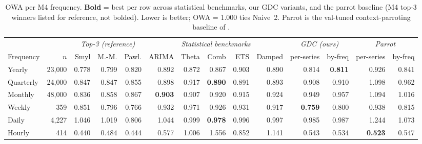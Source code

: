 \begin{table}[t]
\centering
\caption{OWA per M4 frequency. \textbf{Bold} = best per row across statistical benchmarks, our GDC variants, and the parrot baseline (M4 top-3 winners listed for reference, not bolded). Lower is better; OWA = 1.000 ties Naive~2. Parrot is the val-tuned context-parroting baseline of \citet{zhang2025parrot}.}
\label{tab:m4_per_frequency}
\small
\begin{tabular}{l r | r r r | r r r r r | r r | r r}
\toprule
& & \multicolumn{3}{c|}{\emph{Top-3 (reference)}}
& \multicolumn{5}{c|}{\emph{Statistical benchmarks}}
& \multicolumn{2}{c|}{\emph{GDC (ours)}}
& \multicolumn{2}{c}{\emph{Parrot}} \\
\cmidrule(lr){3-5} \cmidrule(lr){6-10} \cmidrule(lr){11-12} \cmidrule(lr){13-14}
Frequency & $n$
& Smyl & M.-M. & Pawl.
& ARIMA & Theta & Comb & ETS & Damped
& per-series & by-freq
& per-series & by-freq \\
\midrule
Yearly     & 23{,}000 & 0.778 & 0.799 & 0.820 & 0.892 & 0.872 & 0.867 & 0.903 & 0.890 & 0.814 & \textbf{0.811} & 0.926 & 0.841 \\
Quarterly  & 24{,}000 & 0.847 & 0.847 & 0.855 & 0.898 & 0.917 & \textbf{0.890} & 0.891 & 0.893 & 0.908 & 0.910 & 1.098 & 0.962 \\
Monthly    & 48{,}000 & 0.836 & 0.858 & 0.867 & \textbf{0.903} & 0.907 & 0.920 & 0.915 & 0.924 & 0.949 & 0.957 & 1.094 & 1.016 \\
Weekly     &     359  & 0.851 & 0.796 & 0.766 & 0.932 & 0.971 & 0.926 & 0.931 & 0.917 & \textbf{0.759} & 0.800 & 0.938 & 0.815 \\
Daily      &  4{,}227 & 1.046 & 1.019 & 0.806 & 1.044 & 0.999 & \textbf{0.978} & 0.996 & 0.997 & 0.985 & 0.987 & 1.244 & 1.073 \\
Hourly     &     414  & 0.440 & 0.484 & 0.444 & 0.577 & 1.006 & 1.556 & 0.852 & 1.141 & 0.543 & 0.534 & \textbf{0.523} & 0.547 \\
\bottomrule
\end{tabular}
\end{table}


